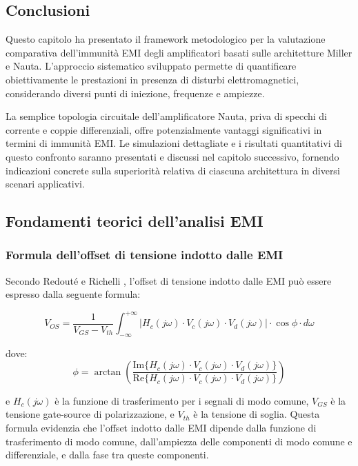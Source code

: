 \subsection{Conclusioni}

Questo capitolo ha presentato il framework metodologico per la valutazione comparativa dell'immunità EMI degli amplificatori basati sulle architetture Miller e Nauta. L'approccio sistematico sviluppato permette di quantificare obiettivamente le prestazioni in presenza di disturbi elettromagnetici, considerando diversi punti di iniezione, frequenze e ampiezze.

La semplice topologia circuitale dell'amplificatore Nauta, priva di specchi di corrente e coppie differenziali, offre potenzialmente vantaggi significativi in termini di immunità EMI. Le simulazioni dettagliate e i risultati quantitativi di questo confronto saranno presentati e discussi nel capitolo successivo, fornendo indicazioni concrete sulla superiorità relativa di ciascuna architettura in diversi scenari applicativi.


\subsection{Fondamenti teorici dell'analisi EMI}

\subsubsection{Formula dell'offset di tensione indotto dalle EMI}

Secondo Redouté e Richelli \cite{Redoute-Richelli_EMC_Magazine}, l'offset di tensione indotto dalle EMI può essere espresso dalla seguente formula:

\begin{equation}
V_{OS} = \frac{1}{V_{GS} - V_{th}} \int_{-\infty}^{+\infty} |H_c(j\omega) \cdot V_c(j\omega) \cdot V_d(j\omega)| \cdot \cos\phi \cdot d\omega
\end{equation}

dove:
\begin{equation}
\phi = \arctan\left(\frac{\text{Im}\{H_c(j\omega) \cdot V_c(j\omega) \cdot V_d(j\omega)\}}{\text{Re}\{H_c(j\omega) \cdot V_c(j\omega) \cdot V_d(j\omega)\}}\right)
\end{equation}

e $H_c(j\omega)$ è la funzione di trasferimento per i segnali di modo comune, $V_{GS}$ è la tensione gate-source di polarizzazione, e $V_{th}$ è la tensione di soglia. Questa formula evidenzia che l'offset indotto dalle EMI dipende dalla funzione di trasferimento di modo comune, dall'ampiezza delle componenti di modo comune e differenziale, e dalla fase tra queste componenti.

